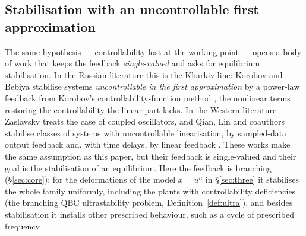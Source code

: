 \documentclass[11pt,reqno]{amsart}
\theoremstyle{plain}
\theoremstyle{definition}
\theoremstyle{remark}
\begin{document}
\subsection{Stabilisation with an uncontrollable first approximation}
The same hypothesis --- controllability lost at the working point --- opens a body of work that
keeps the feedback \emph{single-valued} and asks for equilibrium stabilisation. In the Russian
literature this is the Kharkiv line: Korobov and Bebiya \cite{KorobovBebiya2017} stabilise systems
\emph{uncontrollable in the first approximation} by a power-law feedback from Korobov's
controllability-function method \cite{Korobov1979}, the nonlinear terms restoring the
controllability the linear part lacks. In the Western literature Zaslavsky \cite{Zaslavsky1996} treats the
case of coupled oscillators, and Qian, Lin and coauthors stabilise classes of systems with uncontrollable
linearisation, by sampled-data output feedback \cite{QianDuLi2016} and, with time delays, by linear feedback
\cite{YuLin2024}. These works make the same assumption as this paper, but their feedback is single-valued and
their goal is the stabilisation of an equilibrium. Here the feedback is branching (\S\ref{sec:core}); for the deformations of the model $\dot x=u^{n}$ in \S\ref{sec:three} it stabilises the whole family uniformly, including the plants with controllability deficiencies (the branching QBC ultrastability problem, Definition~\ref{def:ultra}),
and besides stabilisation it installs other prescribed behaviour, such as a cycle of prescribed frequency.
\end{document}

